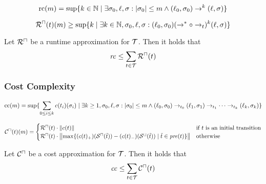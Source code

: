 \begin{definition}
  \[ \text{rc}(m) = \sup \lbrace  k \in \mathbb{N} \mid \exists \sigma_0, \ell, \sigma: \left|\sigma_0\right| \leq m \wedge (\ell_0, \sigma_0) \rightarrow^k (\ell, \sigma)  \rbrace \]
\end{definition}

\begin{definition}
  \[ {\mathcal{R}^\sqcap}(t)(m) \geq \sup \lbrace  k \mid \exists k \in \mathbb{N}, \sigma_0, \ell, \sigma: (\ell_0, \sigma_0) (\rightarrow^* \circ \rightarrow_t)^k (\ell, \sigma)  \rbrace \]
\end{definition}

\begin{theorem}
	Let ${\mathcal{R}^\sqcap}$ be a runtime approximation for $\mathcal{T}$.
	Then it holds that 
	\[ \mathit{rc} \leq \sum_{t \in \mathcal{T}}{\mathcal{R}^\sqcap}(t) \]
\end{theorem}

\subsubsection{Cost Complexity}

\begin{definition}
\[ \text{cc}(m) = \sup \lbrace  \sum_{0 \leq i \leq k} c(t_i)(\sigma_i) \mid \exists k \geq 1, \sigma_0, \ell, \sigma: \left|\sigma_0\right| \leq m \wedge
  (\ell_0, \sigma_0) \rightarrow_{t_0} (\ell_1, \sigma_1) \rightarrow_{t_1} \dots \rightarrow_{t_k} (\ell_k, \sigma_k)  \rbrace \]
\end{definition}

\begin{definition}
  \[ {\mathcal{C}^\sqcap}(t)(m) =
  \begin{cases}
    {\mathcal{R}^\sqcap}(t) \cdot \left\Vert c(t)\right\Vert & \text{if } t \text{ is an initial transition} \\
    {\mathcal{R}^\sqcap}(t) \cdot \left\Vert\max \lbrace (c(t)_+)({\mathcal{S}^\sqcap}(\tilde{t})) - (c(t)_-)({\mathcal{S}^\sqcup}(\tilde{t})) \mid \tilde{t} \in \mathit{pre}(t) \rbrace\right\Vert & \text{otherwise}
  \end{cases}
  \]
\end{definition}

\begin{theorem}
	Let ${\mathcal{C}^\sqcap}$ be a cost approximation for $\mathcal{T}$.
	Then it holds that 
	\[ \mathit{cc} \leq \sum_{t \in \mathcal{T}} {\mathcal{C}^\sqcap}(t) \]
\end{theorem}

